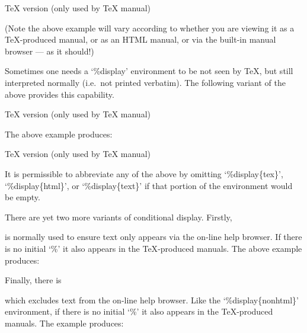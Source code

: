 TeX version (only used by TeX manual)

(Note the above example will vary according to whether you are viewing it
as a {\TeX}-produced manual,  or as an HTML manual,  or via the  built-in
manual browser --- as it should!)

Sometimes one needs a `\%display' environment to be not seen  by  {\TeX},
but still interpreted normally (i.e.~not printed verbatim). The following
variant of the above provides this capability.

\begintt
TeX version (only used by TeX manual)
\endtt

The above example produces:

TeX version (only used by TeX manual)

It  is  permissible  to  abbreviate  any  of  the   above   by   omitting
`\%display\{tex\}', `\%display\{html\}', or `\%display\{text\}'  if  that
portion of the environment would be empty.

There are yet two more variants of conditional display. Firstly,

\begintt
\endtt

is normally used to  ensure  text  only  appears  via  the  on-line  help
browser.  If  there  is  no  initial  `\%'  it  also   appears   in   the
{\TeX}-produced manuals. The above example produces:


Finally, there is

\begintt
\endtt

which  excludes  text  from  the   on-line   help   browser.   Like   the
`\%display\{nonhtml\}' environment, if there is no initial `\%'  it  also
appears in the {\TeX}-produced manuals. The example produces:


